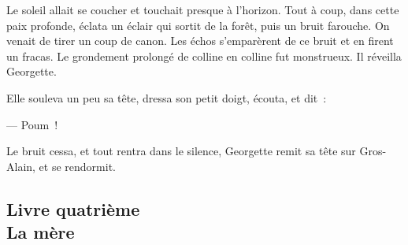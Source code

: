 \documentclass[french,twoside]{book} %
\begin{document}
Le soleil allait se coucher et touchait presque à l’horizon. Tout à coup, dans cette paix profonde, éclata un éclair qui sortit de la forêt, puis un bruit farouche. On venait de tirer un coup de canon. Les échos s’emparèrent  de ce bruit et en firent un fracas. Le grondement prolongé de colline en colline fut monstrueux. Il réveilla Georgette.\par
Elle souleva un peu sa tête, dressa son petit doigt, écouta, et dit :\par
— Poum !\par
Le bruit cessa, et tout rentra dans le silence, Georgette remit sa tête sur Gros-Alain, et se rendormit.\par
  \subsection[{Livre quatrième. La mère}]{Livre quatrième \\
La mère}
\label{p3l4}
\end{document}
